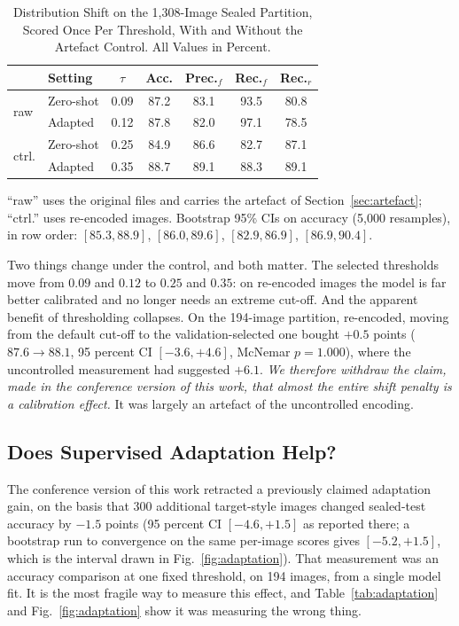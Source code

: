 \documentclass[pdflatex,sn-mathphys-num]{sn-jnl}
\begin{document}
\begin{table}[!tb]
\caption{Distribution Shift on the 1{,}308-Image Sealed Partition, Scored Once
Per Threshold, With and Without the Artefact Control. All Values in Percent.}
\label{tab:shift}
\centering
\setlength{\tabcolsep}{3pt}
\footnotesize
\begin{tabular}{llccccc}
\toprule
& \textbf{Setting} & \textbf{$\tau$} & \textbf{Acc.} &
\textbf{Prec.$_{f}$} & \textbf{Rec.$_{f}$} & \textbf{Rec.$_{r}$} \\
\midrule
\multirow{2}{*}{raw}
& Zero-shot & 0.09 & 87.2 & 83.1 & 93.5 & 80.8 \\
& Adapted   & 0.12 & 87.8 & 82.0 & 97.1 & 78.5 \\
\midrule
\multirow{2}{*}{ctrl.}
& Zero-shot & 0.25 & 84.9 & 86.6 & 82.7 & 87.1 \\
& Adapted   & 0.35 & 88.7 & 89.1 & 88.3 & 89.1 \\
\bottomrule
\end{tabular}
\par\smallskip\parbox{\linewidth}{\footnotesize \footnotesize ``raw'' uses the original
files and carries the artefact of Section~\ref{sec:artefact}; ``ctrl.'' uses
re-encoded images. Bootstrap 95\% CIs on accuracy (5{,}000 resamples), in row
order: $[85.3, 88.9]$, $[86.0, 89.6]$, $[82.9, 86.9]$, $[86.9, 90.4]$.}
\end{table}

Two things change under the control, and both matter. The selected thresholds
move from $0.09$ and $0.12$ to $0.25$ and $0.35$: on re-encoded images the
model is far better calibrated and no longer needs an extreme cut-off. And the
apparent benefit of thresholding collapses. On the 194-image partition,
re-encoded, moving from the default cut-off to the validation-selected one
bought $+0.5$ points ($87.6 \rightarrow 88.1$, 95 percent CI
$[-3.6, +4.6]$, McNemar $p = 1.000$), where the uncontrolled measurement had
suggested $+6.1$. \emph{We therefore withdraw the claim, made in the
conference version of this work, that almost the entire shift penalty is a
calibration effect.} It was largely an artefact of the uncontrolled encoding.

\subsection{Does Supervised Adaptation Help?}
\label{sec:adaptation}

The conference version of this work retracted a previously claimed adaptation
gain, on the basis that 300 additional target-style images changed sealed-test
accuracy by $-1.5$ points (95 percent CI $[-4.6, +1.5]$ as reported there; a
bootstrap run to convergence on the same per-image scores gives
$[-5.2, +1.5]$, which is the interval drawn in Fig.~\ref{fig:adaptation}). That
measurement was an accuracy comparison at one fixed threshold, on 194 images,
from a single model fit. It is the most fragile way to measure this effect, and
Table~\ref{tab:adaptation} and Fig.~\ref{fig:adaptation} show it was measuring
the wrong thing.
\end{document}
